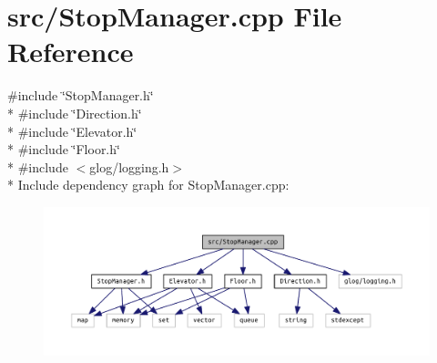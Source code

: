 \section{src/\+Stop\+Manager.cpp File Reference}
\label{_stop_manager_8cpp}
{\ttfamily \#include \char`\"{}Stop\+Manager.\+h\char`\"{}}\\*
{\ttfamily \#include \char`\"{}Direction.\+h\char`\"{}}\\*
{\ttfamily \#include \char`\"{}Elevator.\+h\char`\"{}}\\*
{\ttfamily \#include \char`\"{}Floor.\+h\char`\"{}}\\*
{\ttfamily \#include $<$glog/logging.\+h$>$}\\*
Include dependency graph for Stop\+Manager.\+cpp\+:
\nopagebreak
\begin{figure}[H]
\begin{center}
\leavevmode
\includegraphics[width=350pt]{_stop_manager_8cpp__incl}
\end{center}
\end{figure}
